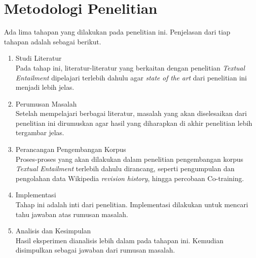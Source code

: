 \section{Metodologi Penelitian}
Ada lima tahapan yang dilakukan pada penelitian ini. Penjelasan dari tiap tahapan adalah sebagai berikut.
\begin{enumerate}
	\item Studi Literatur \\
	Pada tahap ini, literatur-literatur yang berkaitan dengan penelitian \textit{Textual Entailment} dipelajari terlebih dahulu agar \textit{state of the art} dari penelitian ini menjadi lebih jelas.
	\item Perumusan Masalah \\
	Setelah mempelajari berbagai literatur, masalah yang akan diselesaikan dari penelitian ini dirumuskan agar hasil yang diharapkan di akhir penelitian lebih tergambar jelas. 
	\item Perancangan Pengembangan Korpus\\
	Proses-proses yang akan dilakukan dalam penelitian pengembangan korpus \textit{Textual Entailment} terlebih dahulu dirancang, seperti pengumpulan dan pengolahan data Wikipedia \textit{revision history}, hingga percobaan Co-training.
	\item Implementasi  \\
	Tahap ini adalah inti dari penelitian. Implementasi dilakukan untuk mencari tahu jawaban atas rumusan masalah. 
	\item Analisis dan Kesimpulan \\
	Hasil eksperimen dianalisis lebih dalam pada tahapan ini. Kemudian disimpulkan sebagai jawaban dari rumusan masalah.
\end{enumerate}


